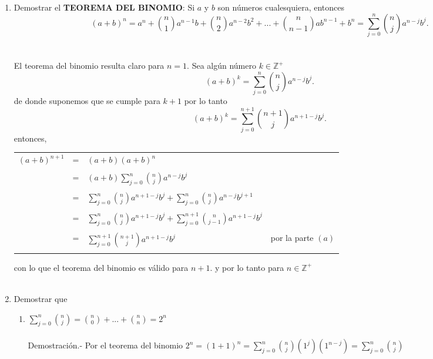 \begin{enumerate}[\bfseries 1.]
\begin{enumerate}[\bfseries (a)]
          \item Demostrar el \textbf{TEOREMA DEL BINOMIO}: Si $a$ \; y \; $b$ son números cualesquiera, entonces
          $$(a+b)^n = a^n + {n \choose 1} a^{n-1} b + {n \choose 2} a^{n-2} b^2 + ... + {n \choose n-1} a b^{n-1} + b^n = \displaystyle \sum_{j=0}^n {n \choose j} a^{n-j} b^j.$$\\\\
          El teorema del binomio resulta claro para $n=1.$ Sea algún número $k \in \mathbb{Z}^+$  
          $$(a+b)^k =  \sum\limits_{j=0}^n {n \choose j} a^{n-j} b^j.$$
          de donde  suponemos que se cumple  para $k+1$ por lo tanto $$(a+b)^k =  \sum\limits_{j=0}^{n+1} {n+1 \choose j} a^{n+1-j} b^j.$$
          entonces,
            \begin{center}
              \begin{tabular}{r c l l}
                $(a+b)^{n+1}$&=&$(a+b)(a+b)^n$&\\\\
                &=&$(a+b) \displaystyle \sum_{j=0}^n {n \choose j} a^{n-j} b^j$&\\\\
                &=&$\displaystyle \sum_{j=0}^n {n \choose j} a^{n+1-j} b^j + \sum_{j=0}^{n} {n \choose j} a^{n-j} b^{j+1}$&\\\\
                &=&$\displaystyle \sum_{j=0}^n {n \choose j} a^{n+1-j} b^j + \sum_{j=0}^{n+1} {n \choose j-1} a^{n+1-j} b^{j}$&\\\\
                &=&$\displaystyle \sum_{j=0}^{n+1} {n+1 \choose j} a^{n+1-j} b^j$& por la parte $(a)$\\\\
              \end{tabular}
            \end{center}
          con lo que el teorema del binomio es válido para $n+1.$ y por lo tanto para $n \in  \mathbb{Z}^+$\\\\

          \item Demostrar que 
          \begin{enumerate}[\bfseries (i)]
            \item $\displaystyle\sum_{j=0}^{n} {n \choose j} = {n \choose 0} + ... + {n \choose n} = 2^n$\\\\
            Demostración.- \; Por el teorema del binomio $2^n=(1+1)^n = \sum\limits_{j=0}^n {n \choose j}(1^j)(1^{n-j})=\sum_{j=0}^n {n \choose j}$\\\\


\end{enumerate}
\end{enumerate}
\end{enumerate}
